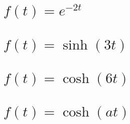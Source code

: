 \documentclass[12pt, a4paper]{article}
\begin{document}
\section{\texorpdfstring{\(f(t)=e^{-2t}\)}{f (t) = e (-2t)}}


\setcounter{section}{13}
\section{\texorpdfstring{\(f(t)=\sinh(3t)\)}{f (t) = sinh (3t)}}


\section{\texorpdfstring{\(f(t)=\cosh(6t)\)}{f (t) = cosh (6t)}}


\setcounter{section}{16}
\section{\texorpdfstring{\(f(t)=\cosh(at)\)}{f (t) = cosh (at)}}
\end{document}
